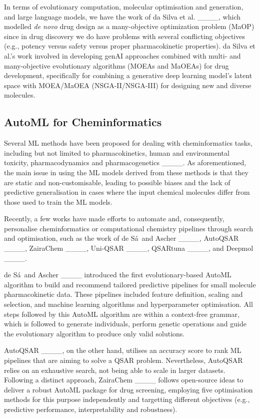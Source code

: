 In terms of evolutionary computation, molecular optimisation and generation, and large language models, we have the work of da Silva et al. ____, which modelled \emph{de novo} drug design as a many-objective optimization problem (MaOP) since in drug discovery we do have problems with several conflicting objectives (e.g., potency versus safety versus proper pharmacokinetic properties). da Silva et al.'s work involved in developing genAI approaches combined with multi- and many-objective evolutionary algorithms (MOEAs and MaOEAs) for drug development, specifically for combining a generative deep learning model’s latent space with MOEA/MaOEA (NSGA-II/NSGA-III) for designing new and diverse molecules.


\subsection{AutoML for Cheminformatics}

Several ML methods have been proposed for dealing with cheminformatics tasks, including but not limited to pharmacokinetics, human and environmental toxicity, pharmacodynamics and pharmacogenetics ____. As aforementioned, the main issue in using the ML models derived from these methods is that they are static and non-customisable, leading to possible biases and the lack of predictive generalisation in cases where the input chemical molecules differ from those used to train the ML models. 

Recently, a few works have made efforts to automate and, consequently, personalise cheminformatics or computational chemistry pipelines through search and optimisation, such as the work of de S\'a\ and Ascher ____, AutoQSAR ____,  ZairaChem ____, Uni-QSAR ____, QSARtuna ____, and Deepmol ____.

de S\'a\ and Ascher ____ introduced the first evolutionary-based AutoML algorithm to build and recommend tailored predictive pipelines for small molecule pharmacokinetic data. These pipelines included feature definition, scaling and selection, and machine learning algorithms and hyperparameter optimisation. All steps followed by this AutoML algorithm are within a context-free grammar, which is followed to generate individuals, perform genetic operations and guide the evolutionary algorithm to produce only valid solutions. 

AutoQSAR ____, on the other hand, utilises an accuracy score to rank ML pipelines that are aiming to solve a QSAR problem. Nevertheless, AutoQSAR relies on an exhaustive search, not being able to scale in larger datasets. Following a distinct approach, ZairaChem ____ follows open-source ideas to deliver a robust AutoML package for drug screening, employing five optimisation methods for this purpose independently and targetting different objectives (e.g., predictive performance, interpretability and robustness).

